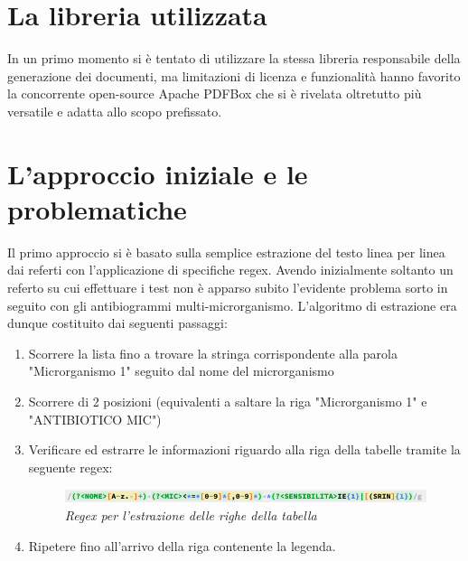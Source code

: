 \section{La libreria utilizzata}
In un primo momento si è tentato di utilizzare la stessa libreria responsabile della generazione dei documenti, ma limitazioni di licenza e funzionalità hanno favorito la concorrente open-source Apache PDFBox che si è rivelata oltretutto più versatile e adatta allo scopo prefissato.
\section{L'approccio iniziale e le problematiche}
Il primo approccio si è basato sulla semplice estrazione del testo linea per linea dai referti con l'applicazione di specifiche regex. 
Avendo inizialmente soltanto un referto su cui effettuare i test non è apparso subito l'evidente problema sorto in seguito con gli antibiogrammi multi-microrganismo.
L'algoritmo di estrazione era dunque costituito dai seguenti passaggi:
\begin{enumerate}
\item Scorrere la lista fino a trovare la stringa corrispondente alla parola "Microrganismo 1" seguito dal nome del microrganismo
\item Scorrere di 2 posizioni (equivalenti a saltare la riga "Microrganismo 1" e "ANTIBIOTICO MIC")
\newpage
\item Verificare ed estrarre le informazioni riguardo alla riga della tabelle tramite la seguente regex:
\begin{figure}[h!]
	\centering
	\includegraphics[width=.99\columnwidth]{images/regex.png}
	\caption{\textit{Regex per l'estrazione delle righe della tabella}}
	\label{fig:content_multi_1}
\end{figure}
\item Ripetere fino all'arrivo della riga contenente la legenda.
\end{enumerate}

